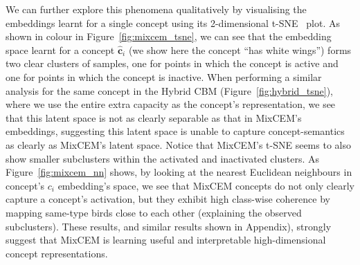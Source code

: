 \documentclass[withindex,glossary]{cam-thesis}
\theoremstyle{plain}
\theoremstyle{definition}
\theoremstyle{remark}
\begin{document}
We can further explore this phenomena qualitatively by visualising the embeddings learnt for a single concept using its 2-dimensional t-SNE~\citep{van2008visualizing} plot.
As shown in colour in Figure~\ref{fig:mixcem_tsne}, we can see that the embedding space learnt for a concept $\hat{\mathbf{c}}_i$ (we show here the concept ``has white wings'') forms two clear clusters of samples, one for points in which the concept is active and one for points in which the concept is inactive. When performing a similar analysis for the same concept in the Hybrid CBM (Figure~\ref{fig:hybrid_tsne}), where we use the entire extra capacity as the concept's representation, we see that this latent space is not as clearly separable as that in MixCEM's embeddings, suggesting this latent space is unable to capture concept-semantics as clearly as MixCEM's latent space. Notice that MixCEM's t-SNE seems to also show smaller subclusters within the activated and inactivated clusters. As Figure~\ref{fig:mixcem_nn} shows, by looking at the nearest Euclidean neighbours in concept's $c_i$ embedding's space, we see that MixCEM concepts do not only clearly capture a concept's activation, but they exhibit high class-wise coherence by mapping same-type birds close to each other (explaining the observed subclusters). These results, and similar results shown in Appendix), strongly suggest that MixCEM is learning useful and interpretable high-dimensional concept representations.

\end{document}
